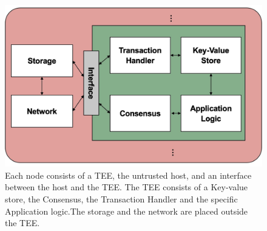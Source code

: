 \begin{figure}[t]
	\includegraphics[scale=0.14]{pictures/ccf}
	\caption{Each node consists of a TEE, the untrusted host, and an interface between the host and the TEE. The TEE consists of a Key-value store, the Consensus, the Transaction Handler and the specific Application logic.The storage and the network are placed outside the TEE.}
	\label{ccf}
\end{figure}
